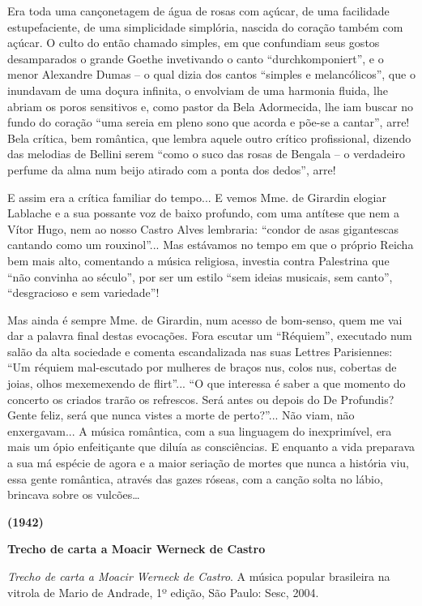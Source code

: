 Era toda uma cançonetagem de água de rosas com açúcar, de uma facilidade
estupefaciente, de uma simplicidade simplória, nascida do coração também
com açúcar. O culto do então chamado simples, em que confundiam seus
gostos desamparados o grande Goethe invetivando o canto
``durchkomponiert'', e o menor Alexandre Dumas -- o qual dizia dos
cantos ``simples e melancólicos'', que o inundavam de uma doçura
infinita, o envolviam de uma harmonia fluida, lhe abriam os poros
sensitivos e, como pastor da Bela Adormecida, lhe iam buscar no fundo do
coração ``uma sereia em pleno sono que acorda e põe-se a cantar'', arre!
Bela crítica, bem romântica, que lembra aquele outro crítico
profissional, dizendo das melodias de Bellini serem ``como o suco das
rosas de Bengala -- o verdadeiro perfume da alma num beijo atirado com a
ponta dos dedos'', arre!

E assim era a crítica familiar do tempo... E vemos Mme. de Girardin
elogiar Lablache e a sua possante voz de baixo profundo, com uma
antítese que nem a Vítor Hugo, nem ao nosso Castro Alves lembraria:
``condor de asas gigantescas cantando como um rouxinol''... Mas
estávamos no tempo em que o próprio Reicha bem mais alto, comentando a
música religiosa, investia contra Palestrina que ``não convinha ao
século'', por ser um estilo ``sem ideias musicais, sem canto'',
``desgracioso e sem variedade''!

Mas ainda é sempre Mme. de Girardin, num acesso de bom-senso, quem me
vai dar a palavra final destas evocações. Fora escutar um ``Réquiem'',
executado num salão da alta sociedade e comenta escandalizada nas suas
Lettres Parisiennes: ``Um réquiem mal-escutado por mulheres de braços
nus, colos nus, cobertas de joias, olhos mexemexendo de flirt''... ``O
que interessa é saber a que momento do concerto os criados trarão os
refrescos. Será antes ou depois do De Profundis? Gente feliz, será que
nunca vistes a morte de perto?''... Não viam, não enxergavam... A música
romântica, com a sua linguagem do inexprimível, era mais um ópio
enfeitiçante que diluía as consciências. E enquanto a vida preparava a
sua má espécie de agora e a maior seriação de mortes que nunca a
história viu, essa gente romântica, através das gazes róseas, com a
canção solta no lábio, brincava sobre os vulcões\ldots{}

\textbf{(1942)}

\textbf{Trecho de carta a Moacir Werneck de Castro}

\emph{Trecho de carta a Moacir Werneck de Castro}. A música popular
brasileira na vitrola de Mario de Andrade, 1º edição, São Paulo: Sesc,
2004.

